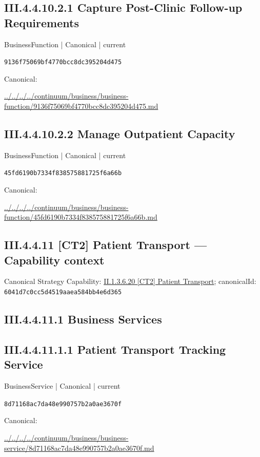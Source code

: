 \documentclass[10pt,a4paper]{article}
\begin{document}
\subsection*{III.4.4.10.2.1 Capture Post-Clinic Follow-up Requirements}
\label{element-9136f75069bf4770bcc8dc395204d475}
{\small BusinessFunction | Canonical | current}\par
\texttt{9136f75069bf4770bcc8dc395204d475}\par
Canonical: \par
{\footnotesize\url{../../../../continuum/business/business-function/9136f75069bf4770bcc8dc395204d475.md}}\par
\subsection*{III.4.4.10.2.2 Manage Outpatient Capacity}
\label{element-45fd6190b7334f838575881725f6a66b}
{\small BusinessFunction | Canonical | current}\par
\texttt{45fd6190b7334f838575881725f6a66b}\par
Canonical: \par
{\footnotesize\url{../../../../continuum/business/business-function/45fd6190b7334f838575881725f6a66b.md}}\par
\subsection*{III.4.4.11 [CT2] Patient Transport — Capability context}
Canonical Strategy Capability: \hyperref[element-6041d7c0cc5d4519aaea584bb4e6d365]{II.1.3.6.20 [CT2] Patient Transport}; canonicalId: \texttt{6041d7c0cc5d4519aaea584bb4e6d365}\par
\subsection*{III.4.4.11.1 Business Services}
\subsection*{III.4.4.11.1.1 Patient Transport Tracking Service}
\label{element-8d71168ac7da48e990757b2a0ae3670f}
{\small BusinessService | Canonical | current}\par
\texttt{8d71168ac7da48e990757b2a0ae3670f}\par
Canonical: \par
{\footnotesize\url{../../../../continuum/business/business-service/8d71168ac7da48e990757b2a0ae3670f.md}}\par
\end{document}
